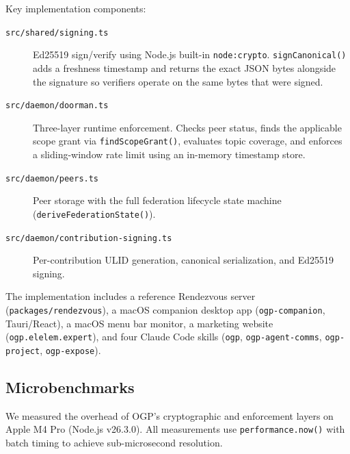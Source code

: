 \documentclass[sigconf,nonacm]{acmart}
\begin{document}
Key implementation components:
\begin{description}
\item[\texttt{src/shared/signing.ts}] Ed25519 sign/verify using Node.js
  built-in \texttt{node:crypto}. \texttt{signCanonical()} adds a
  freshness timestamp and returns the exact JSON bytes alongside the
  signature so verifiers operate on the same bytes that were signed.
\item[\texttt{src/daemon/doorman.ts}] Three-layer runtime enforcement.
  Checks peer status, finds the applicable scope grant via
  \texttt{findScopeGrant()}, evaluates topic coverage, and enforces
  a sliding-window rate limit using an in-memory timestamp store.
\item[\texttt{src/daemon/peers.ts}] Peer storage with the full federation
  lifecycle state machine (\texttt{deriveFederationState()}).
\item[\texttt{src/daemon/contribution-signing.ts}] Per-contribution
  ULID generation, canonical serialization, and Ed25519 signing.
\end{description}

The implementation includes a reference Rendezvous server
(\texttt{packages/rendezvous}), a macOS companion desktop app
(\texttt{ogp-companion}, Tauri/React), a macOS menu bar monitor, a
marketing website (\texttt{ogp.elelem.expert}), and four Claude Code
skills (\texttt{ogp}, \texttt{ogp-agent-comms}, \texttt{ogp-project},
\texttt{ogp-expose}).

\subsection{Microbenchmarks}

We measured the overhead of OGP's cryptographic and enforcement layers
on Apple M4 Pro (Node.js v26.3.0).
All measurements use \texttt{performance.now()} with batch timing to
achieve sub-microsecond resolution.
\end{document}
